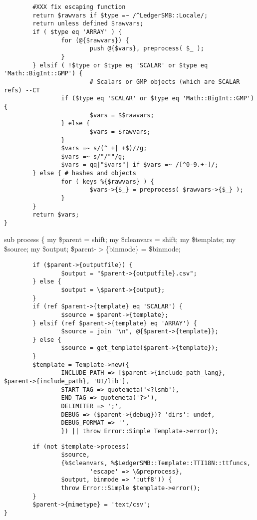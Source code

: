 \begin{description}
\begin{description}
\begin{description}
\begin{description}
\begin{description}
\begin{description}
\begin{description}
\begin{description}
\begin{description}
\begin{description}
\begin{verbatim}
        #XXX fix escaping function
        return $rawvars if $type =~ /^LedgerSMB::Locale/;
        return unless defined $rawvars;
        if ( $type eq 'ARRAY' ) {
                for (@{$rawvars}) {
                        push @{$vars}, preprocess( $_ );
                }
        } elsif ( !$type or $type eq 'SCALAR' or $type eq 'Math::BigInt::GMP') { 
                        # Scalars or GMP objects (which are SCALAR refs) --CT
                if ($type eq 'SCALAR' or $type eq 'Math::BigInt::GMP') {
                        $vars = $$rawvars;
                } else {
                        $vars = $rawvars;
                }
                $vars =~ s/(^ +| +$)//g;
                $vars =~ s/"/""/g;
                $vars = qq|"$vars"| if $vars =~ /[^0-9.+-]/;
        } else { # hashes and objects
                for ( keys %{$rawvars} ) {
                        $vars->{$_} = preprocess( $rawvars->{$_} );
                }
        }
        return $vars;
}
\end{verbatim}


sub process \{
	my \$parent = shift;
	my \$cleanvars = shift;
	my \$template;
	my \$source;
	my \$output;
        \$parent-$>$\{binmode\} = \$binmode;

\begin{verbatim}
        if ($parent->{outputfile}) {
                $output = "$parent->{outputfile}.csv";
        } else {
                $output = \$parent->{output};
        }
        if (ref $parent->{template} eq 'SCALAR') {
                $source = $parent->{template};
        } elsif (ref $parent->{template} eq 'ARRAY') {
                $source = join "\n", @{$parent->{template}};
        } else {
                $source = get_template($parent->{template});
        }
        $template = Template->new({
                INCLUDE_PATH => [$parent->{include_path_lang}, $parent->{include_path}, 'UI/lib'],
                START_TAG => quotemeta('<?lsmb'),
                END_TAG => quotemeta('?>'),
                DELIMITER => ';',
                DEBUG => ($parent->{debug})? 'dirs': undef,
                DEBUG_FORMAT => '',
                }) || throw Error::Simple Template->error();
\end{verbatim}
\begin{verbatim}
        if (not $template->process(
                $source, 
                {%$cleanvars, %$LedgerSMB::Template::TTI18N::ttfuncs,
                        'escape' => \&preprocess},
                $output, binmode => ':utf8')) {
                throw Error::Simple $template->error();
        }
        $parent->{mimetype} = 'text/csv';
}
\end{verbatim}



\end{description}
\end{description}
\end{description}
\end{description}
\end{description}
\end{description}
\end{description}
\end{description}
\end{description}
\end{description}
